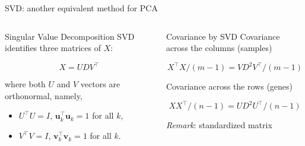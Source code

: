 \documentclass[
  ignorenonframetext,
  aspectratio=169]{beamer}
\begin{document}
\begin{frame}{SVD: another equivalent method for PCA}
\protect\hypertarget{svd-another-equivalent-method-for-pca}{}
\begin{columns}[T]
\begin{column}{.45\textwidth}
\begin{block}{Singular Value Decomposition}
\protect\hypertarget{singular-value-decomposition}{}
SVD identifies three matrices of \(X\):

\[X = U D V^{\top}\]

where both \(U\) and \(V\) vectors are orthonormal, namely,

\begin{itemize}
\item
  \(U^{\top}U = I\), \(\mathbf{u}_{k}^{\top}\mathbf{u}_{k}=1\) for all
  \(k\),
\item
  \(V^{\top}V = I\), \(\mathbf{v}_{k}^{\top}\mathbf{v}_{k} = 1\) for all
  \(k\).
\end{itemize}
\end{block}
\end{column}

\begin{column}{.45\textwidth}
\begin{block}{Covariance by SVD}
\protect\hypertarget{covariance-by-svd}{}
Covariance across the columns (samples)

\[X^{\top}X/(m-1) = V D^{2} V^{\top}/(m-1)\]

Covariance across the rows (genes)

\[XX^{\top}/(n-1) = U D^{2} U^{\top}/(n-1)\]
\end{block}

\emph{Remark}: standardized matrix
\end{column}
\end{columns}
\end{frame}
\end{document}
